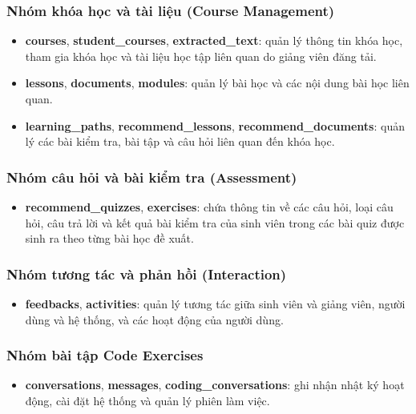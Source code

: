 \subsubsection{Nhóm khóa học và tài liệu (Course Management)}
\begin{itemize}
    \item \textbf{courses}, \textbf{student\_courses}, \textbf{extracted\_text}: quản lý thông tin khóa học, tham gia khóa học và tài liệu học tập liên quan do giảng viên đăng tải.
    \item \textbf{lessons}, \textbf{documents}, \textbf{modules}: quản lý bài học và các nội dung bài học liên quan.
    \item \textbf{learning\_paths}, \textbf{recommend\_lessons}, \textbf{recommend\_documents}: quản lý các bài kiểm tra, bài tập và câu hỏi liên quan đến khóa học.
\end{itemize}

\subsubsection{Nhóm câu hỏi và bài kiểm tra (Assessment)}
\begin{itemize}
    \item \textbf{recommend\_quizzes}, \textbf{exercises}: chứa thông tin về các câu hỏi, loại câu hỏi, câu trả lời và kết quả bài kiểm tra của sinh viên trong các bài quiz được sinh ra theo từng bài học đề xuất.
\end{itemize}

\subsubsection{Nhóm tương tác và phản hồi (Interaction)}
\begin{itemize}
    \item  \textbf{feedbacks}, \textbf{activities}: quản lý tương tác giữa sinh viên và giảng viên, người dùng và hệ thống, và các hoạt động của người dùng.
\end{itemize}

\subsubsection{Nhóm bài tập Code Exercises}
\begin{itemize}
    \item \textbf{conversations}, \textbf{messages}, \textbf{coding\_conversations}: ghi nhận nhật ký hoạt động, cài đặt hệ thống và quản lý phiên làm việc.
\end{itemize}

